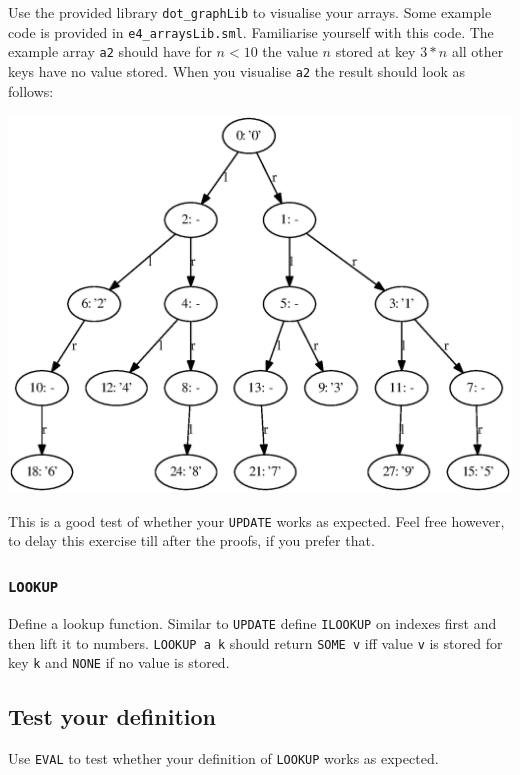 \documentclass[a4paper,10pt,oneside]{scrartcl}
\begin{document}
Use the provided library \texttt{dot\_graphLib} to visualise your
arrays. Some example code is provided in
\texttt{e4\_arraysLib.sml}. Familiarise yourself with this code. The
example array \texttt{a2} should have for $n < 10$ the value $n$
stored at key $3*n$ all other keys have no value stored.  When you
visualise \texttt{a2} the result should look as follows:

\begin{center}
\includegraphics[width=14cm]{a2.eps}
\end{center}

This is a good test of whether your \texttt{UPDATE} works as expected. Feel free however, to
delay this exercise till after the proofs, if you prefer that.


\subsubsection{\texttt{LOOKUP}}

Define a lookup function. Similar to \texttt{UPDATE} define \texttt{ILOOKUP} on indexes first and
then lift it to numbers. \texttt{LOOKUP a k} should return \texttt{SOME v} iff value \texttt{v} is
stored for key \texttt{k} and \texttt{NONE} if no value is stored.


\subsection{Test your definition}

Use \texttt{EVAL} to test whether your definition of \texttt{LOOKUP} works as expected.
\end{document}
